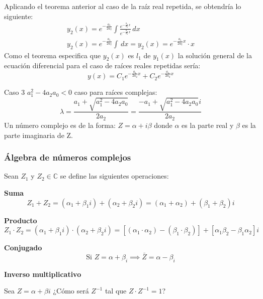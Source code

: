 Aplicando el teorema anterior al caso de la raíz real repetida, se obtendría lo siguiente:
\begin{align*}
    y_2(x) = e^{ -\frac{a_1}{2a_2}}\int \frac{e^{ -\frac{a_1}{a_2}x}}{e^{ -\frac{a_1}{a_2}x}}\,dx\\
    y_2(x) = e^{ -\frac{a_1}{2a_2}}\int\,dx =y_2(x) = e^{ -\frac{a_1}{2a_2}x}\cdot x
\end{align*}
Como el teorema especifica que $y_2(x)$ es $l_1$ de $y_1(x)$ la solución general de la ecuación diferencial para el caso de raíces reales repetidas sería:
\begin{equation}
    y(x) = C_1 e^{ -\frac{a_1}{2a_2}x} + C_2 e^{ -\frac{a_1}{2a_2}x}
\end{equation}

Caso 3 $a_1^2-4a_2a_0<0$ caso para raíces complejas:
\begin{equation*}
    \lambda = \frac{ a_1 + \sqrt{a_1^2 -4a_2a_0}}{2a_2} = \frac{ - a_1 + \sqrt{a_1^2 -4a_2a_0}i}{2a_2}
\end{equation*}
Un número complejo es de la forma: $Z=\alpha +i\beta$
donde $\alpha$ es la parte real y $\beta$ es la parte imaginaria de Z.
\subsubsection{Álgebra de números complejos}

Sean $Z_1$ y $Z_2\in \mathbb{C} $ se define las siguientes operaciones:

\textbf{Suma}
\begin{equation}
    Z_1 + Z_2 = \left(\alpha_1 +\beta_{1}i\right) +\left(\alpha_2 +\beta_2i\right) =\left(\alpha_1 +\alpha_2 \right) +\left(\beta_1+\beta_{2}\right)i
\end{equation}

\textbf{Producto}
\begin{equation}
    Z_1 \cdot Z_2 = \left(\alpha_1 +\beta_{1}i\right) \cdot \left(\alpha_2 +\beta_2i\right) = \left[\left( \alpha_1\cdot \alpha_2 \right) - \left(\beta_1\cdot\beta_2\right)\right] + \left[\alpha_1\beta_2 -\beta_1\alpha_2\right]i
\end{equation}

\textbf{Conjugado}
\begin{equation}
    \text{Si } Z=\alpha +\beta_i \implies \bar{Z}=\alpha -\beta_i
\end{equation}


\textbf{Inverso multiplicativo}

Sea $Z=\alpha+ \beta i$ ¿Cómo será $Z^{-1}$ tal que $Z\cdot Z^{-1}=1$?

